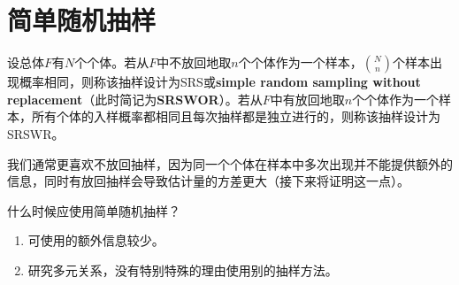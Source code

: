 \section{简单随机抽样}

\begin{definition}
	设总体$F$有$N$个个体。若从$F$中不放回地取$n$个个体作为一个样本，$\binom{N}{n}$个样本出现概率相同，则称该抽样设计为\gls{SRS}或\textbf{simple random sampling without replacement}（此时简记为\textbf{SRSWOR}）。若从$F$中有放回地取$n$个个体作为一个样本，所有个体的入样概率都相同且每次抽样都是独立进行的，则称该抽样设计为\gls{SRSWR}。
\end{definition}
\begin{note}
	我们通常更喜欢不放回抽样，因为同一个个体在样本中多次出现并不能提供额外的信息，同时有放回抽样会导致估计量的方差更大（接下来将证明这一点）。
\end{note}
什么时候应使用简单随机抽样？
\begin{enumerate}
	\item 可使用的额外信息较少。
	\item 研究多元关系，没有特别特殊的理由使用别的抽样方法。
\end{enumerate}

